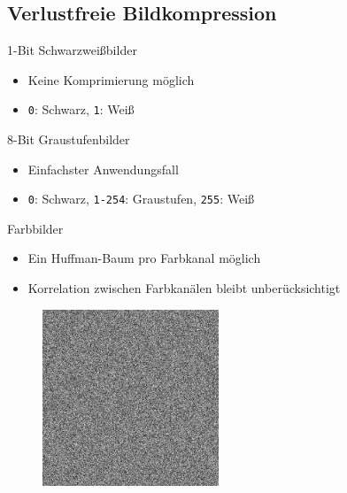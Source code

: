 \documentclass[xcolor=dvipsnames,presentation]{beamer}    %
\newenvironment{witemize}{\itemize\setlength{\itemsep}{1em}}{\enditemize}
\begin{document}
\subsection{Verlustfreie Bildkompression}

\begin{frame}{\insertsubsection}
\begin{witemize}
\item 1-Bit Schwarzweißbilder
  \begin{itemize}
    \item Keine Komprimierung möglich
    \item {\tt0}: Schwarz, {\tt1}: Weiß
  \end{itemize}

\item 8-Bit Graustufenbilder
  \begin{itemize}
    \item Einfachster Anwendungsfall
    \item {\tt0}: Schwarz, {\tt1-254}: Graustufen, {\tt255}: Weiß
  \end{itemize}

\item Farbbilder
  \begin{itemize}
    \item Ein Huffman-Baum pro Farbkanal möglich
    \item Korrelation zwischen Farbkanälen bleibt unberücksichtigt
  \end{itemize}
\end{witemize}
\end{frame}

\begin{frame}{\insertsubsection}
\begin{figure}[T]
  \centering
  \includegraphics[width=0.470\textwidth]{bilder/uniformnoise.png}
  \hfill
\end{figure}
\end{frame}
\end{document}

